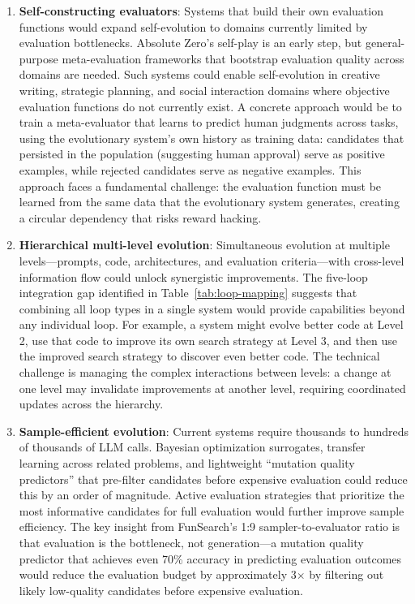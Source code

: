 \begin{enumerate}
    \item \textbf{Self-constructing evaluators}: Systems that build their own evaluation functions would expand self-evolution to domains currently limited by evaluation bottlenecks. Absolute Zero's self-play is an early step, but general-purpose meta-evaluation frameworks that bootstrap evaluation quality across domains are needed. Such systems could enable self-evolution in creative writing, strategic planning, and social interaction domains where objective evaluation functions do not currently exist. A concrete approach would be to train a meta-evaluator that learns to predict human judgments across tasks, using the evolutionary system's own history as training data: candidates that persisted in the population (suggesting human approval) serve as positive examples, while rejected candidates serve as negative examples. This approach faces a fundamental challenge: the evaluation function must be learned from the same data that the evolutionary system generates, creating a circular dependency that risks reward hacking.

    \item \textbf{Hierarchical multi-level evolution}: Simultaneous evolution at multiple levels---prompts, code, architectures, and evaluation criteria---with cross-level information flow could unlock synergistic improvements. The five-loop integration gap identified in Table~\ref{tab:loop-mapping} suggests that combining all loop types in a single system would provide capabilities beyond any individual loop. For example, a system might evolve better code at Level 2, use that code to improve its own search strategy at Level 3, and then use the improved search strategy to discover even better code. The technical challenge is managing the complex interactions between levels: a change at one level may invalidate improvements at another level, requiring coordinated updates across the hierarchy.

    \item \textbf{Sample-efficient evolution}: Current systems require thousands to hundreds of thousands of LLM calls. Bayesian optimization surrogates, transfer learning across related problems, and lightweight ``mutation quality predictors'' that pre-filter candidates before expensive evaluation could reduce this by an order of magnitude. Active evaluation strategies that prioritize the most informative candidates for full evaluation would further improve sample efficiency. The key insight from FunSearch's 1:9 sampler-to-evaluator ratio is that evaluation is the bottleneck, not generation---a mutation quality predictor that achieves even 70\% accuracy in predicting evaluation outcomes would reduce the evaluation budget by approximately 3$\times$ by filtering out likely low-quality candidates before expensive evaluation.


\end{enumerate}
